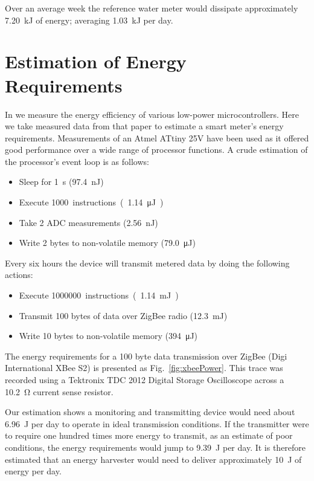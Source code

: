 \documentclass[10pt,final,journal]{IEEEtran}
\begin{document}
    Over an average week the reference water meter would dissipate approximately \SI{7.20}{\kilo\joule} of energy; averaging \SI{1.03}{\kilo\joule} per day.

    \section{Estimation of Energy Requirements}
    \label{sect:powerRequirements}
    In \cite{Jones2011} we measure the energy efficiency of various low-power microcontrollers.
    Here we take measured data from that paper to estimate a smart meter's energy requirements.
    Measurements of an Atmel ATtiny 25V have been used as it offered good performance over a wide range of processor functions.
    A crude estimation of the processor's event loop is as follows:
    \begin{itemize}
    \item Sleep for \SI{1}{\second} (\SI{97.4}{\nano\joule})
    \item Execute \SI{1000} instructions (\SI{1.14}{\micro\joule})
    \item Take 2 ADC measurements (\SI{2.56}{\nano\joule})
    \item Write 2 bytes to non-volatile memory (\SI{79.0}{\micro\joule})
    \end{itemize}
    Every six hours the device will transmit metered data by doing the following actions:
    \begin{itemize}
    \item Execute \SI{1000000} instructions (\SI{1.14}{\milli\joule})
    \item Transmit 100 bytes of data over ZigBee radio (\SI{12.3}{\milli\joule})
    \item Write 10 bytes to non-volatile memory (\SI{394}{\micro\joule})
    \end{itemize}

    The energy requirements for a 100 byte data transmission over ZigBee (Digi International XBee S2) is presented as Fig.~\ref{fig:xbeePower}.
    This trace was recorded using a Tektronix TDC 2012 Digital Storage Oscilloscope across a \SI{10.2}{\ohm} current sense resistor.

    Our estimation shows a monitoring and transmitting device would need about \SI{6.96}{\joule} per day to operate in ideal transmission conditions.
    If the transmitter were to require one hundred times more energy to transmit, as an estimate of poor conditions, the energy requirements would jump to \SI{9.39}{\joule} per day.
    It is therefore estimated that an energy harvester would need to deliver approximately \SI{10}{\joule} of energy per day.
\end{document}
